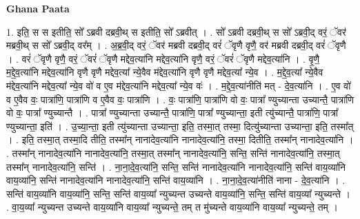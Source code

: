 \documentclass[17pt]{extarticle}
\begin{document}
\textbf{Ghana Paata } \newline

1. इति॒ स स इतीति॒ सो᳚ ऽब्रवी दब्रवी॒थ् स इतीति॒ सो᳚ ऽब्रवीत् । . सो᳚ ऽब्रवी दब्रवी॒थ् स सो᳚ ऽब्रवी॒द् वरं॒ ॅवर॑ मब्रवी॒थ् स सो᳚ ऽब्रवी॒द् वर᳚म् । . अ॒ब्र॒वी॒द् वरं॒ ॅवर॑ मब्रवी दब्रवी॒द् वरं॑ ॅवृणै वृणै॒ वर॑ मब्रवी दब्रवी॒द् वरं॑ ॅवृणै । . वरं॑ ॅवृणै वृणै॒ वरं॒ ॅवरं॑ ॅवृणै मद्देव॒त्या॑नि मद्देव॒त्या॑नि वृणै॒ वरं॒ ॅवरं॑ ॅवृणै मद्देव॒त्या॑नि । . वृ॒णै॒ म॒द्दे॒व॒त्या॑नि मद्देव॒त्या॑नि वृणै वृणै मद्देव॒त्या᳚ न्ये॒वैव म॑द्देव॒त्या॑नि वृणै वृणै मद्देव॒त्या᳚ न्ये॒व । . म॒द्दे॒व॒त्या᳚ न्ये॒वैव म॑द्देव॒त्या॑नि मद्देव॒त्या᳚ न्ये॒व वो॑ व ए॒व म॑द्देव॒त्या॑नि मद्देव॒त्या᳚ न्ये॒व वः॑ । . म॒द्दे॒व॒त्या॑नीति॑ मत् - दे॒व॒त्या॑नि । . ए॒व वो॑ व ए॒वैव वः॒ पात्रा॑णि॒ पात्रा॑णि व ए॒वैव वः॒ पात्रा॑णि । . वः॒ पात्रा॑णि॒ पात्रा॑णि वो वः॒ पात्रा᳚ ण्युच्यान्ता उच्यान्तै॒ पात्रा॑णि वो वः॒ पात्रा᳚ ण्युच्यान्तै । . पात्रा᳚ ण्युच्यान्ता उच्यान्तै॒ पात्रा॑णि॒ पात्रा᳚ ण्युच्यान्ता॒ इती त्यु॑च्यान्तै॒ पात्रा॑णि॒ पात्रा᳚ ण्युच्यान्ता॒ इति॑ । . उ॒च्या॒न्ता॒ इती त्यु॑च्यान्ता उच्यान्ता॒ इति॒ तस्मा॒त् तस्मा॒ दित्यु॑च्यान्ता उच्यान्ता॒ इति॒ तस्मा᳚त् । . इति॒ तस्मा॒त् तस्मा॒दि तीति॒ तस्मा᳚न् नानादेव॒त्या॑नि नानादेव॒त्या॑नि॒ तस्मा॒ दितीति॒ तस्मा᳚न् नानादेव॒त्या॑नि । . तस्मा᳚न् नानादेव॒त्या॑नि नानादेव॒त्या॑नि॒ तस्मा॒त् तस्मा᳚न् नानादेव॒त्या॑नि॒ सन्ति॒ सन्ति॑ नानादेव॒त्या॑नि॒ तस्मा॒त् तस्मा᳚न् नानादेव॒त्या॑नि॒ सन्ति॑ । . ना॒ना॒दे॒व॒त्या॑नि॒ सन्ति॒ सन्ति॑ नानादेव॒त्या॑नि नानादेव॒त्या॑नि॒ सन्ति॑ वाय॒व्या॑नि वाय॒व्या॑नि॒ सन्ति॑ नानादेव॒त्या॑नि नानादेव॒त्या॑नि॒ सन्ति॑ वाय॒व्या॑नि । . ना॒ना॒दे॒व॒त्या॑नीति॑ नाना - दे॒व॒त्या॑नि । . सन्ति॑ वाय॒व्या॑नि वाय॒व्या॑नि॒ सन्ति॒ सन्ति॑ वाय॒व्या᳚ न्युच्यन्त उच्यन्ते वाय॒व्या॑नि॒ सन्ति॒ सन्ति॑ वाय॒व्या᳚ न्युच्यन्ते । . वा॒य॒व्या᳚ न्युच्यन्त उच्यन्ते वाय॒व्या॑नि वाय॒व्या᳚ न्युच्यन्ते॒ तम् त मु॑च्यन्ते वाय॒व्या॑नि वाय॒व्या᳚ न्युच्यन्ते॒ तम् । \newline
\end{document}
